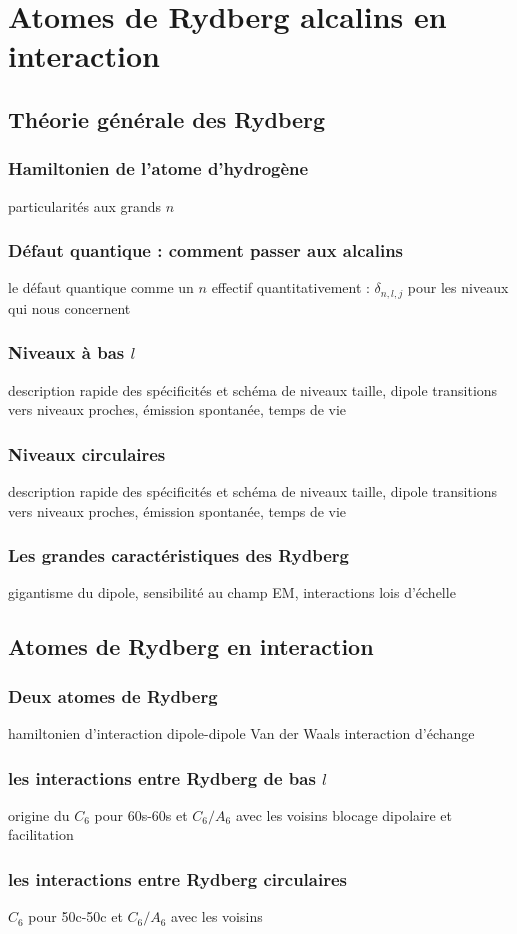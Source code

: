 \chapter{Atomes de Rydberg alcalins en interaction}
\label{chapter:Rydberg}

\section{Théorie générale des Rydberg}
	\subsection*{Hamiltonien de l'atome d'hydrogène}
		\noindent particularités aux grands $n$
	\subsection*{Défaut quantique : comment passer aux alcalins}
		\noindent le défaut quantique comme un $n$ effectif
		\noindent quantitativement : $\delta_{n,l,j}$ pour les niveaux qui nous concernent
	\subsection*{Niveaux à bas $l$}
		\noindent description rapide des spécificités et schéma de niveaux
		\noindent taille, dipole
		\noindent transitions vers niveaux proches, émission spontanée, temps de vie
	\subsection*{Niveaux circulaires}
		\noindent description rapide des spécificités et schéma de niveaux
		\noindent taille, dipole
		\noindent transitions vers niveaux proches, émission spontanée, temps de vie
	\subsection*{Les grandes caractéristiques des Rydberg}
		\noindent gigantisme du dipole, sensibilité au champ EM, interactions
		\noindent lois d'échelle

\section{Atomes de Rydberg en interaction}
	\subsection*{Deux atomes de Rydberg}
		\noindent hamiltonien d'interaction
		\noindent dipole-dipole
		\noindent Van der Waals
		\noindent interaction d'échange
	\subsection*{les interactions entre Rydberg de bas $l$}
		\noindent origine du $C_6$ pour 60s-60s et $C_6/A_6$ avec les voisins
		\noindent blocage dipolaire et facilitation
	\subsection*{les interactions entre Rydberg circulaires}
		\noindent $C_6$ pour 50c-50c et $C_6/A_6$ avec les voisins